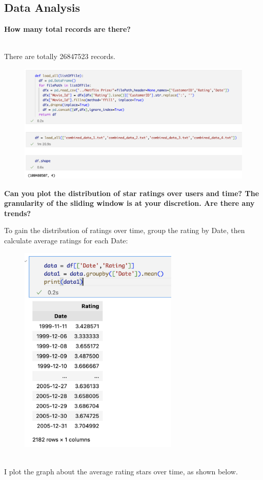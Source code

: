 \documentclass{article}
\begin{document}
\subsection{Data Analysis}
\begin{enumerate}
{
\linespread{2.0} \selectfont
    \item \textbf{How many total records are there?}
}
\\
    There are totally 26847523 records.
    \begin{center}
    \begin{figure}[H]
    \centering
    \includegraphics[width=14cm]{images/total data.png}
    \end{figure}
    \end{center}
{
\linespread{2.0} \selectfont
\item \textbf{Can you plot the distribution of star ratings over users and time?  The granularity of the sliding window is at your discretion. Are there any trends?}
}
To gain the distribution of ratings over time, group the rating by Date, then calculate average ratings for each Date:
\begin{center}
    \begin{figure}[H]
    \centering
    \includegraphics[height=10cm]{images/group by date.png}
    \end{figure}
\end{center}
\\ I plot the graph about the average rating stars over time, as shown below.


\end{enumerate}
\end{document}

